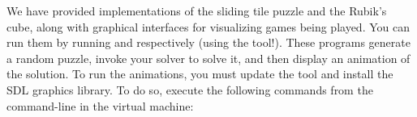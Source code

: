 \documentclass{pset}
\begin{document}
We have provided implementations of the sliding tile puzzle and the
Rubik's cube, along with graphical interfaces for visualizing games
being played. You can run them by running  and
 respectively (using the  tool!).
These programs generate a random puzzle, invoke your solver to solve
it, and then display an animation of the solution. To run the
animations, you must update the  tool and install the SDL
graphics library. To do so, execute the following commands from the
command-line in the virtual machine:

\smallskip

\begin{ocaml}
\end{ocaml}
\end{document}
